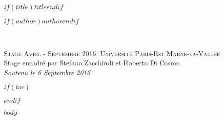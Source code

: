 \documentclass[$if(fontsize)$$fontsize$$endif$,fleqn]{book} %
\begin{document}
\let\cleardoublepage\clearpage


\begingroup
\thispagestyle{empty}
\centering
\vspace*{5cm}
\par\normalfont\fontsize{35}{35}\sffamily\selectfont
\textbf{$if(title)$$title$$endif$}\\
{\LARGE }\par %
\vspace*{1cm}
{\Huge $if(author)$$author$$endif$}\par %
\endgroup


\newpage
~\vfill
\thispagestyle{empty}


\noindent \textsc{Stage Avril - Septembre 2016, Université Paris-Est Marne-la-Vallée}\\

\noindent Stage encadré par Stefano Zacchiroli et Roberto Di Cosmo\\ %

\noindent \textit{Soutenu le 6 Septembre 2016} %


$if(toc)$

\pagestyle{empty} %

\renewcommand\contentsname{Table des Matières}
\renewcommand{\bibname}{Bibliographie}
\tableofcontents%


\pagestyle{fancy} %
$endif$


$body$
\end{document}
